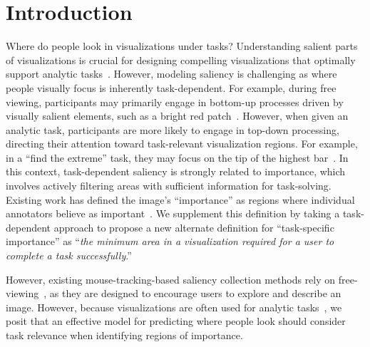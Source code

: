 \section{Introduction}



Where do people look in visualizations under tasks?
Understanding salient parts of visualizations is crucial for designing compelling visualizations that optimally support analytic tasks~\cite{graphicDesignImportance}. 
However, modeling saliency is challenging as where people visually focus is inherently task-dependent. 
For example, during free viewing, participants may primarily engage in bottom-up processes driven by visually salient elements, such as a bright red patch~\cite{kinchla1979ordervisualprocesse}.
However, when given an analytic task, participants are more likely to engage in top-down processing, directing their attention toward task-relevant visualization regions. For example, in a ``find the extreme'' task, they may focus on the tip of the highest bar~\cite{gilbert2013topdown}.
In this context, task-dependent saliency is strongly related to importance, which involves actively filtering areas with sufficient information for task-solving.
Existing work has defined the image's ``importance'' as regions where individual annotators believe as important~\cite{importAnnot}. 
We supplement this definition by taking a task-dependent approach to propose a new alternate definition for ``task-specific importance'' as ``\textit{the minimum area in a visualization required for a user to complete a task successfully}.'' 


However, existing mouse-tracking-based saliency collection methods rely on free-viewing~\cite{turkeyes, importAnnot, bubbleView}, as they are designed to encourage users to explore and describe an image. However, because visualizations are often used for analytic tasks~\cite{amar2005low}, we posit that an effective model for predicting where people look should consider task relevance when identifying regions of importance.


